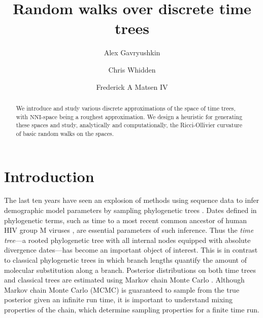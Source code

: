 \documentclass{amsart}
\newcommand{\nni}{\mathrm{NNI}}
\begin{document}
\title{Random walks over discrete time trees}

\author{Alex Gavryushkin}
\address{Department of Computer Science, The University of Auckland, New Zealand}

\author{Chris Whidden}
\address{Program in Computational Biology, Fred Hutchinson Cancer Research Center, Seattle, WA 98109}

\author{Frederick A Matsen IV}


\begin{abstract}
We introduce and study various discrete approximations of the space of time trees, with $\nni$-space being a roughest approximation.
We design a heuristic for generating these spaces and study, analytically and computationally, the Ricci-Ollivier curvature of basic random walks on the spaces.
\end{abstract}


\maketitle


\section{Introduction}
The last ten years have seen an explosion of methods using sequence data to infer demographic model parameters by sampling phylogenetic trees \autocite{Kuhner1995-mj,Kuhner1998-tq,Kuhner2000-af,Beerli2001-sc,Kuhner2006-vx,Drummond2002,Drummond2005-ks,Drummond2006-oa,Minin2008-wz}.
Dates defined in phylogenetic terms, such as time to a most recent common ancestor of human HIV group M viruses \autocite{Worobey2008-rt,Baele2013-op}, are essential parameters of such inference.
Thus the {\em time tree}---a rooted phylogenetic tree with all internal nodes equipped with absolute divergence dates---has become an important object of interest.
This is in contrast to classical phylogenetic trees in which branch lengths quantify the amount of molecular substitution along a branch.
Posterior distributions on both time trees and classical trees are estimated using Markov chain Monte Carlo \autocite{Mau1997-sq,Yang1997-gv,Drummond2002}.
Although Markov chain Monte Carlo (MCMC) is guaranteed to sample from the true posterior given an infinite run time, it is important to understand mixing properties of the chain, which determine sampling properties for a finite time run.
\end{document}
